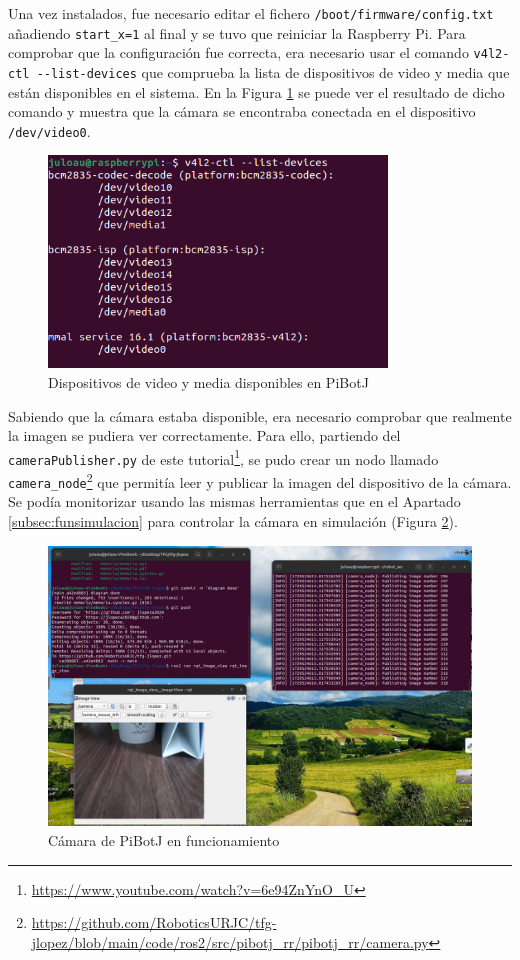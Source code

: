 Una vez instalados, fue necesario editar el fichero \verb|/boot/firmware/config.txt| añadiendo \verb|start_x=1| al final y se tuvo que reiniciar la Raspberry Pi. Para comprobar que la configuración fue correcta, era necesario usar el comando \verb|v4l2-ctl --list-devices|  que comprueba la lista de dispositivos de video y media que están disponibles en el sistema. En la Figura \ref{fig:v4l2} se puede ver el resultado de dicho comando y  muestra que la cámara se encontraba conectada en el dispositivo \verb|/dev/video0|.

 
 \begin{figure} [h!]
	\begin{center}
		\includegraphics[width=9cm]{figs/cap6/vl.png}
	\end{center}
	\caption{Dispositivos de video y media disponibles en PiBotJ}
	\label{fig:v4l2}
\end{figure}


Sabiendo que la cámara estaba disponible, era necesario comprobar que realmente la imagen se pudiera ver correctamente. Para ello, partiendo del \verb|cameraPublisher.py| de este tutorial\footnote{\url{https://www.youtube.com/watch?v=6e94ZnYnO_U}}, se pudo crear un nodo llamado \verb|camera_node|\footnote{\url{https://github.com/RoboticsURJC/tfg-jlopez/blob/main/code/ros2/src/pibotj_rr/pibotj_rr/camera.py}} que permitía leer y publicar la imagen del dispositivo de la cámara. Se podía monitorizar usando las mismas herramientas que en el Apartado \ref{subsec:funsimulacion} para controlar la cámara en simulación (Figura \ref{fig:camararr}).

 \begin{figure} [h!]
	\begin{center}
		\includegraphics[width=12cm]{figs/cap6/camerarr.png}
	\end{center}
	\caption{Cámara de PiBotJ en funcionamiento}
	\label{fig:camararr}
\end{figure}

